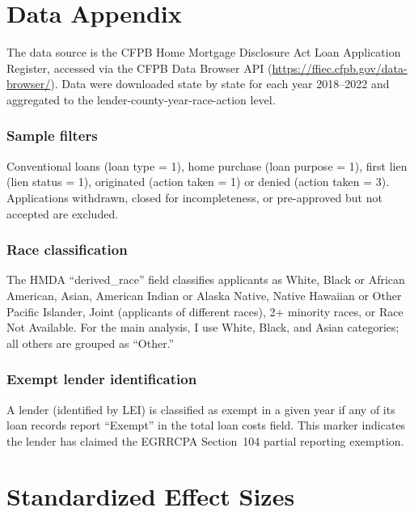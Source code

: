 \documentclass[12pt]{article}
\begin{document}
\newpage
\appendix

\section{Data Appendix}

The data source is the CFPB Home Mortgage Disclosure Act Loan Application Register, accessed via the CFPB Data Browser API (\url{https://ffiec.cfpb.gov/data-browser/}). Data were downloaded state by state for each year 2018--2022 and aggregated to the lender-county-year-race-action level.

\subsubsection*{Sample filters} Conventional loans (loan type = 1), home purchase (loan purpose = 1), first lien (lien status = 1), originated (action taken = 1) or denied (action taken = 3). Applications withdrawn, closed for incompleteness, or pre-approved but not accepted are excluded.

\subsubsection*{Race classification} The HMDA ``derived\_race'' field classifies applicants as White, Black or African American, Asian, American Indian or Alaska Native, Native Hawaiian or Other Pacific Islander, Joint (applicants of different races), 2+ minority races, or Race Not Available. For the main analysis, I use White, Black, and Asian categories; all others are grouped as ``Other.''

\subsubsection*{Exempt lender identification} A lender (identified by LEI) is classified as exempt in a given year if any of its loan records report ``Exempt'' in the total loan costs field. This marker indicates the lender has claimed the EGRRCPA Section~104 partial reporting exemption.

\section{Standardized Effect Sizes}
\label{sec:sde}


\end{document}
